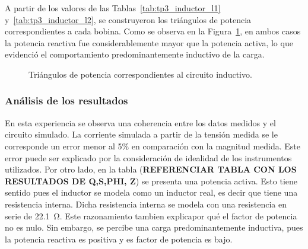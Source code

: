 A partir de los valores de las Tablas~\ref{tab:tp3_inductor_l1} y~\ref{tab:tp3_inductor_l2}, se construyeron los triángulos de potencia correspondientes a cada bobina. Como se observa en la Figura~\ref{fig:triangulos_inductivo}, en ambos casos la potencia reactiva fue considerablemente mayor que la potencia activa, lo que evidenció el comportamiento predominantemente inductivo de la carga.

\begin{figure}[H]
    \centering
    \begin{minipage}{0.38\textwidth}
        \centering
    \end{minipage}
    \hspace{0.8cm}
    \begin{minipage}{0.38\textwidth}
        \centering
    \end{minipage}
    \caption{Triángulos de potencia correspondientes al circuito inductivo.}
    \label{fig:triangulos_inductivo}
\end{figure}

\subsubsection{Análisis de los resultados}

En esta experiencia se observa una coherencia entre los datos medidos y el circuito simulado. La corriente simulada a partir de la tensión medida se le corresponde un error menor al 5\% en comparación con la magnitud medida. Este error puede ser explicado por la consideración de idealidad de los instrumentos utilizados. 
Por otro lado, en la tabla (\textbf{REFERENCIAR TABLA CON LOS RESULTADOS DE Q,S,PHI, Z}) se presenta una potencia activa. Esto tiene sentido pues el inductor se modela como un inductor real, es decir que tiene una resistencia interna. Dicha resistencia interna se modela con una resistencia en serie de \SI{22.1}{\ohm}. Este razonamiento tambien explicapor qué el factor de potencia no es nulo. Sin embargo, se percibe una carga predominantemente inductiva, pues la potencia reactiva es positiva y es factor de potencia es bajo.

